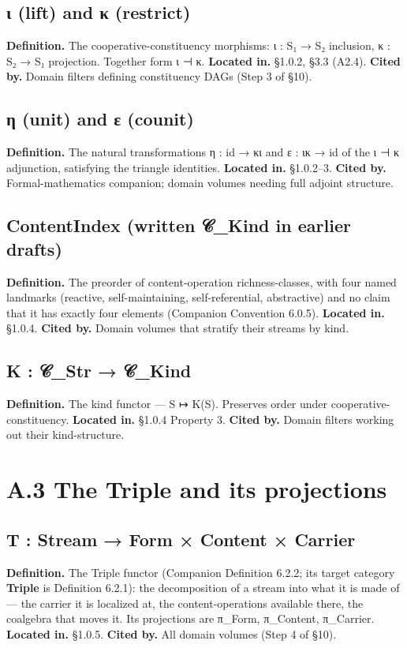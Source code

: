\documentclass[11pt, openany]{book}
\newcommand{\sectionbreak}{\clearpage}
\begin{document}
\subsection{ι (lift) and κ (restrict)}
\textbf{Definition.} The cooperative-constituency morphisms: ι : S₁ → S₂ inclusion, κ : S₂ → S₁ projection. Together form ι ⊣ κ.
\textbf{Located in.} §1.0.2, §3.3 (A2.4).
\textbf{Cited by.} Domain filters defining constituency DAGs (Step 3 of §10).

\subsection{η (unit) and ε (counit)}
\textbf{Definition.} The natural transformations η : id → κι and ε : ικ → id of the ι ⊣ κ adjunction, satisfying the triangle identities.
\textbf{Located in.} §1.0.2–3.
\textbf{Cited by.} Formal-mathematics companion; domain volumes needing full adjoint structure.

\subsection{ContentIndex (written 𝒞\_\allowbreak{}Kind in earlier drafts)}
\textbf{Definition.} The preorder of content-operation richness-classes, with four named landmarks (reactive, self-maintaining, self-referential, abstractive) and no claim that it has exactly four elements (Companion Convention 6.0.5).
\textbf{Located in.} §1.0.4.
\textbf{Cited by.} Domain volumes that stratify their streams by kind.

\subsection{K : 𝒞\_\allowbreak{}Str → 𝒞\_\allowbreak{}Kind}
\textbf{Definition.} The kind functor --- S ↦ K(S). Preserves order under cooperative-constituency.
\textbf{Located in.} §1.0.4 Property 3.
\textbf{Cited by.} Domain filters working out their kind-structure.

\sectionbreak

\section{A.3 The Triple and its projections}

\subsection{T : Stream → Form × Content × Carrier}
\textbf{Definition.} The Triple functor (Companion Definition 6.2.2; its target category \textbf{Triple} is Definition 6.2.1): the decomposition of a stream into what it is made of --- the carrier it is localized at, the content-operations available there, the coalgebra that moves it. Its projections are π\_\allowbreak{}Form, π\_\allowbreak{}Content, π\_\allowbreak{}Carrier.
\textbf{Located in.} §1.0.5.
\textbf{Cited by.} All domain volumes (Step 4 of §10).
\end{document}
